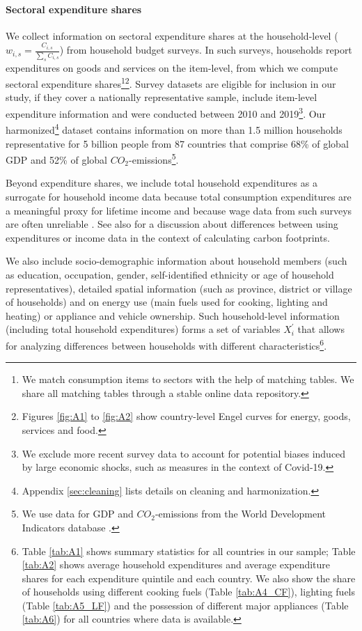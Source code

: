 \documentclass[12pt, a4paper]{article}
\begin{document}
\paragraph{Sectoral expenditure shares} We collect information on sectoral expenditure shares at the household-level ($w_{i,s}=\frac{C_{i,s}}{\sum_{s}C_{i,s}}$) from household budget surveys. In such surveys, households report expenditures on goods and services on the item-level, from which we compute sectoral expenditure shares\footnote{We match consumption items to sectors with the help of matching tables. We share all matching tables through a stable online data repository.}\footnote{Figures \ref{fig:A1} to \ref{fig:A2} show country-level Engel curves for energy, goods, services and food.}.
Survey datasets are eligible for inclusion in our study, if they cover a nationally representative sample, include item-level expenditure information and were conducted between 2010 and 2019\footnote{We exclude more recent survey data to account for potential biases induced by large economic shocks, such as measures in the context of Covid-19.}. Our harmonized\footnote{Appendix \ref{sec:cleaning} lists details on cleaning and harmonization.} dataset contains information on more than 1.5 million households representative for 5 billion people from 87 countries that comprise 68\% of global GDP and 52\% of global $CO_{2}$-emissions\footnote{We use data for GDP and $CO_{2}$-emissions from the World Development Indicators database \autocite{WorldBankGroup.2023}.}.

Beyond expenditure shares, we include total household expenditures as a surrogate for household income data because total consumption expenditures are a meaningful proxy for lifetime income \autocite{Poterba.1989,JamesM.Poterba.2016} and because wage data from such surveys are often unreliable \autocite{Blundell.1998}. See also \textcite{Levay.2023} for a discussion about differences between using expenditures or income data in the context of calculating carbon footprints.

We also include socio-demographic information about household members (such as education, occupation, gender, self-identified ethnicity or age of household representatives), detailed spatial information (such as province, district or village of households) and on energy use (main fuels used for cooking, lighting and heating) or appliance and vehicle ownership. Such household-level information (including total household expenditures) forms a set of variables $X_{i}^{'}$ that allows for analyzing differences between households with different characteristics\footnote{Table \ref{tab:A1} shows summary statistics for all countries in our sample; Table \ref{tab:A2} shows average household expenditures and average expenditure shares for each expenditure quintile and each country. We also show the share of households using different cooking fuels (Table \ref{tab:A4_CF}), lighting fuels (Table \ref{tab:A5_LF}) and the possession of different major appliances (Table \ref{tab:A6}) for all countries where data is available.}. 
\end{document}
